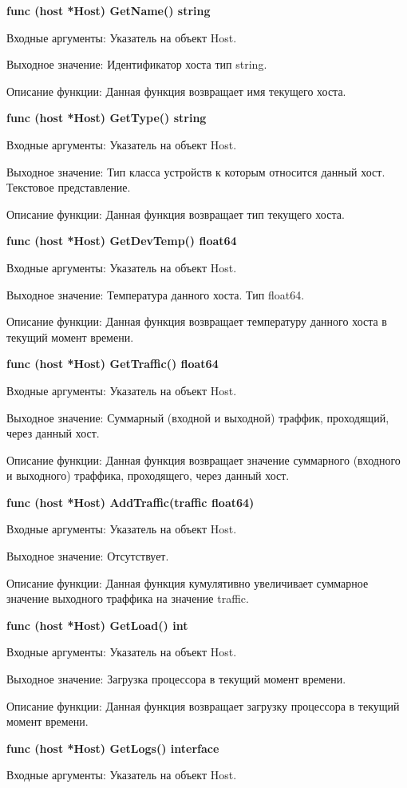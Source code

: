 \textbf{func (host *Host) GetName() string }

Входные аргументы: Указатель на объект Host.

Выходное значение: Идентификатор хоста тип string.

Описание функции: Данная функция возвращает имя текущего хоста.


\textbf{func (host *Host) GetType() string }

Входные аргументы: Указатель на объект Host.

Выходное значение: Тип класса устройств к которым относится данный хост. Текстовое представление.

Описание функции: Данная функция возвращает тип текущего хоста.


\textbf{func (host *Host) GetDevTemp() float64 }

Входные аргументы: Указатель на объект Host.

Выходное значение: Температура данного хоста. Тип float64.

Описание функции: Данная функция возвращает температуру данного хоста в текущий момент времени.


\textbf{func (host *Host) GetTraffic() float64}

Входные аргументы: Указатель на объект Host.

Выходное значение: Суммарный (входной и выходной) траффик, проходящий, через данный хост. 

Описание функции: Данная функция возвращает значение суммарного (входного и выходного) траффика, проходящего, через данный хост.


\textbf{func (host *Host) AddTraffic(traffic float64)}

Входные аргументы: Указатель на объект Host.

Выходное значение: Отсутствует.

Описание функции: Данная функция кумулятивно увеличивает суммарное значение выходного траффика на значение traffic. 


\textbf{func (host *Host) GetLoad() int }

Входные аргументы: Указатель на объект Host.

Выходное значение: Загрузка процессора в текущий момент времени.

Описание функции: Данная функция возвращает загрузку процессора в текущий момент времени.


\textbf{func (host *Host) GetLogs() interface}

Входные аргументы: Указатель на объект Host.

